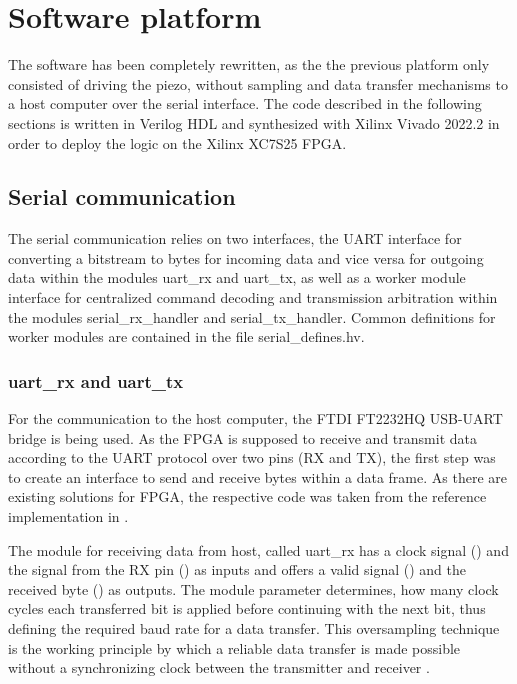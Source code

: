 \documentclass[
	english,
	ruledheaders=section, %
	class=report,%
	thesis={type=Project Seminar Report},%
	accentcolor=TUDa-1d, %
	custommargins=false,%
	marginpar=false,%
	parskip=half-,%
	fontsize=11pt,%
]{tudapub}
\newcommand{\inlcode}[1]{\textit{\detokenize{#1}}}
\begin{document}
\section{Software platform}
The software has been completely rewritten, as the the previous platform only consisted of driving the piezo, without sampling and data transfer mechanisms to a host computer over the serial interface. The code described in the following sections is written in Verilog \gls{HDL} and synthesized with Xilinx Vivado 2022.2 in order to deploy the logic on the Xilinx XC7S25 \gls{FPGA}.

\subsection{Serial communication}\label{sec:serial}
The serial communication relies on two interfaces, the \gls{UART} interface for converting a bitstream to bytes for incoming data and vice versa for outgoing data within the modules uart\_rx and uart\_tx, as well as a worker module interface for centralized command decoding and transmission arbitration within the modules serial\_rx\_handler and serial\_tx\_handler. Common definitions for worker modules are contained in the file serial\_defines.hv.

\subsubsection{uart\_rx and uart\_tx}
For the communication to the host computer, the FTDI FT2232HQ USB-UART bridge is being used. As the \gls{FPGA} is supposed to receive and transmit data according to the \gls{UART} protocol over two pins (RX and TX), the first step was to create an interface to send and receive bytes within a data frame. As there are existing solutions for FPGA, the respective code was taken from the reference implementation in \autocite{nandlandUARTVHDLVerilog2022}.

The module for receiving data from host, called uart\_rx has a clock signal (\inlcode{i_Clock}) and the signal from the RX pin (\inlcode{i_Rx_Serial}) as inputs and offers a valid signal (\inlcode{o_Rx_DV}) and the received byte (\inlcode{o_Rx_Byte}) as outputs. The module parameter \inlcode{CLKS_PER_BIT} determines, how many clock cycles each transferred bit is applied before continuing with the next bit, thus defining the required baud rate for a data transfer. This oversampling technique is the working principle by which a reliable data transfer is made possible without a synchronizing clock between the transmitter and receiver \autocite{maximintegratedDeterminingClockAccuracy2003}.
\end{document}

